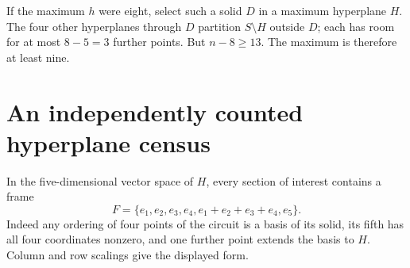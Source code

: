 \documentclass[10pt]{article}
\begin{document}
If the maximum $h$ were eight, select such a solid $D$ in a maximum hyperplane $H$. The four other hyperplanes through $D$ partition $S\setminus H$ outside $D$; each has room for at most $8-5=3$ further points. But $n-8\ge13$. The maximum is therefore at least nine.

\section{An independently counted hyperplane census}
In the five-dimensional vector space of $H$, every section of interest contains a frame
\[
 F=\{e_1,e_2,e_3,e_4,e_1+e_2+e_3+e_4,e_5\}.
\]
Indeed any ordering of four points of the circuit is a basis of its solid, its fifth has all four coordinates nonzero, and one further point extends the basis to $H$. Column and row scalings give the displayed form.
\end{document}
